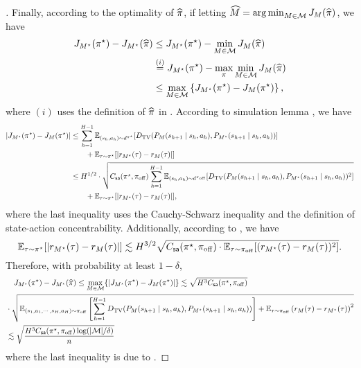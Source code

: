 \documentclass{article}
\begin{document}
\begin{proof}[]
    Finally, according to the optimality of $\widehat{\pi}$, if letting $\widehat{M} = \mathop{\arg\min}_{M\in \mathcal{M}} J_M(\widehat{\pi})$, we have 
    \begin{align*} 
        J_{M^\star}(\pi^\star) - J_{M^\star}(\widehat{\pi}) & \le J_{M^\star}(\pi^\star) - \min_{M\in \mathcal{M}} J_M(\widehat{\pi})\\
        & \stackrel{(i)}{=} J_{M^\star}(\pi^\star) - \max_{\pi} \min_{M\in \mathcal{M}} J_M(\widehat{\pi})\\
        & \le \max_{M\in \mathcal{M}} \left\{J_{M^\star}(\pi^\star) - J_{M}(\pi^\star)\right\},
    \end{align*}
    where $(i)$ uses the definition of $\widehat{\pi}$ in . According to simulation lemma \citep[e.g.,][Lemma 7]{uehara2021pessimistic}, we have
    \begin{align*} 
        \left|J_{M^\star}(\pi^\star) - J_M(\pi^\star)\right| & \le \sum_{h=1}^{H-1}\mathbb{E}_{(s_h, a_h)\sim d^{\pi^\star}}[D_{\mathrm{TV}}(P_M(s_{h+1}\mid s_h, a_h), P_{M^\star}(s_{h+1}\mid s_h, a_h))]\\
        & \qquad + \mathbb{E}_{\tau\sim \pi^\star}[|r_{M^\star}(\tau) - r_{M}(\tau)|]\\
        & \le H^{1/2}\cdot \sqrt{C_{\mathsf{sa}}(\pi^\star, \pi_{\mathrm{off}})\sum_{h=1}^{H-1}\mathbb{E}_{(s_h, a_h)\sim d^{\pi_{\mathrm{off}}}}[D_{\mathrm{TV}}(P_M(s_{h+1}\mid s_h, a_h), P_{M^\star}(s_{h+1}\mid s_h, a_h))^2]}\\
        & \qquad + \mathbb{E}_{\tau\sim \pi^\star}[|r_{M^\star}(\tau) - r_{M}(\tau)|],
    \end{align*}
    where the last inequality uses the Cauchy-Schwarz inequality and the definition of state-action concentrability. Additionally, according to , we have 
    $$\mathbb{E}_{\tau\sim \pi^\star}[|r_{M^\star}(\tau) - r_{M}(\tau)|]\lesssim H^{3/2}\sqrt{C_{\mathsf{sa}}(\pi^\star, \pi_{\mathrm{off}})\cdot \mathbb{E}_{\tau\sim \pi_{\mathrm{off}}}[(r_{M^\star}(\tau) - r_M(\tau))^2]}.$$
    Therefore, with probability at least $1 - \delta$, 
    \begin{align*} 
        &\quad J_{M^\star}(\pi^\star) - J_{M^\star}(\widehat{\pi})\le \max_{M\in \mathcal{M}}\{|J_{M^\star}(\pi^\star) - J_M(\pi^\star)|\}\lesssim \sqrt{H^3 C_{\mathsf{sa}}(\pi^\star, \pi_{\mathrm{off}})}\\
        &\cdot \sqrt{\mathbb{E}_{(s_1, a_1, \cdots, s_H, a_H)\sim \pi_{\mathrm{off}}} \left[\sum_{h=1}^{H-1} D_{\mathrm{TV}}(P_M(s_{h+1}\mid s_h, a_h), P_{M^\star}(s_{h+1}\mid s_h, a_h))\right] + \mathbb{E}_{\tau\sim \pi_{\mathrm{off}}}\left(r_M(\tau) - r_{M^\star}(\tau)\right)^2}\\
        & \lesssim \sqrt{\frac{H^3 C_{\mathsf{sa}}(\pi^\star, \pi_{\mathrm{off}})\log(|\mathcal{M}|/\delta)}{n}}
    \end{align*}
    where the last inequality is due to .
\end{proof}
\end{document}

